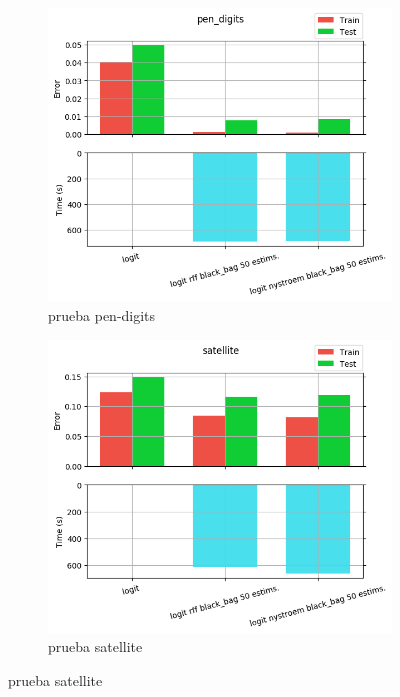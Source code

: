 \begin{figure}[ht]
  \centering
  \begin{subfigure}[b]{0.5\linewidth}
    \centering\includegraphics[width=\imgscale\linewidth]{Figures/2_2/pen_digits}
    \caption{prueba pen-digits}
    \label{fig:2_2_pen_digits}
  \end{subfigure}%
  \begin{subfigure}[b]{0.5\linewidth}
    \centering\includegraphics[width=\imgscale\linewidth]{Figures/2_2/satellite}
    \caption{prueba satellite}
    \label{fig:2_2_satellite}
  \end{subfigure}
\end{figure}

